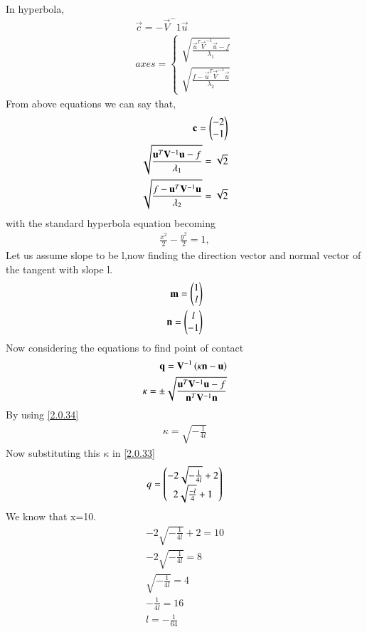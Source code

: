 \documentclass[journal,12pt,twocolumn]{IEEEtran}
\begin{document}
In hyperbola,
\begin{align}
\vec{c}=-\vec{V}^-1\vec{u}\\
axes=
\begin{cases}
\sqrt{\frac{\vec{u}^T\vec{V}^{-1}\vec{u}-f}{\lambda_1}}\\ \sqrt{\frac{f-\vec{u}^T\vec{V}^{-1}\vec{u}}{\lambda_2}}
\end{cases}
\end{align}
From above equations we can say that,
\begin{align}
\mathbf{c}=\begin{pmatrix}-2\\-1\end{pmatrix}\\
\sqrt{\frac{\mathbf{u}^T\mathbf{V}^{-1}\mathbf{u}-f}{\lambda_1}}=\sqrt{2}\\
\sqrt{\frac{f-\mathbf{u}^T\mathbf{V}^{-1}\mathbf{u}}{\lambda_2}}=\sqrt{2}
\end{align}
with the standard hyperbola equation becoming
\begin{align}
\frac{x^2}{2}-\frac{y^2}{2} = 1,
\label{2.0.30}
\end{align}
Let us assume slope to be l,now finding the direction vector and normal vector of the tangent with slope l.
\begin{align}
\mathbf{m}=\begin{pmatrix}1\\l\end{pmatrix}\\
\mathbf{n}=\begin{pmatrix}l\\-1\end{pmatrix}
\end{align}
Now considering the equations to find point of contact
\begin{align} \mathbf{q} = \mathbf{V}^{-1}\left(\kappa \mathbf{n}-\mathbf{u}\right)\label{2.0.33}
\\
\kappa = \pm \sqrt{\frac{\mathbf{u}^T\mathbf{V}^{-1}\mathbf{u}-f}{\mathbf{n}^T\mathbf{V}^{-1}\mathbf{n}}} \label{2.0.34}
\end{align}
By using \eqref{2.0.34}
\begin{align}
\kappa=\sqrt{-\frac{1}{4l}}
\end{align}
Now substituting this $\kappa$ in \eqref{2.0.33}
\begin{align}
q=\begin{pmatrix}-2\sqrt{-\frac{1}{4l}}+2\\2\sqrt{\frac{-l}{4}}+1\end{pmatrix}
\end{align}
We know that x=10.
\begin{align}
-2\sqrt{-\frac{1}{4l}}+2=10\\
-2\sqrt{-\frac{1}{4l}}=8\\
\sqrt{-\frac{1}{4l}}=4\\
-\frac{1}{4l}=16\\
l=-\frac{1}{64}
\end{align}
\end{document}
